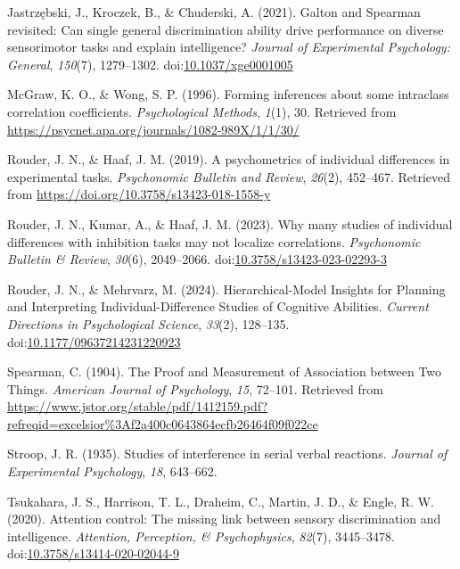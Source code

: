 \documentclass[
  ,man]{apa6}
\newlength{\cslhangindent}
\newenvironment{CSLReferences}[2] %
 {\begin{list}{}{%
  \setlength{\itemindent}{0pt}
  \setlength{\leftmargin}{0pt}
  \setlength{\parsep}{0pt}
  \ifodd #1
   \setlength{\leftmargin}{\cslhangindent}
   \setlength{\itemindent}{-1\cslhangindent}
  \fi
  \setlength{\itemsep}{#2\baselineskip}}}
 {\end{list}}
\begin{document}
\begin{CSLReferences}{1}{0}
Jastrzębski, J., Kroczek, B., \& Chuderski, A. (2021). Galton and {Spearman} revisited: {Can} single general discrimination ability drive performance on diverse sensorimotor tasks and explain intelligence? \emph{Journal of Experimental Psychology: General}, \emph{150}(7), 1279--1302. doi:\href{https://doi.org/10.1037/xge0001005}{10.1037/xge0001005}

McGraw, K. O., \& Wong, S. P. (1996). Forming inferences about some intraclass correlation coefficients. \emph{Psychological Methods}, \emph{1}(1), 30. Retrieved from \url{https://psycnet.apa.org/journals/1082-989X/1/1/30/}

Rouder, J. N., \& Haaf, J. M. (2019). A psychometrics of individual differences in experimental tasks. \emph{Psychonomic Bulletin and Review}, \emph{26}(2), 452--467. Retrieved from \url{https://doi.org/10.3758/s13423-018-1558-y}

Rouder, J. N., Kumar, A., \& Haaf, J. M. (2023). Why many studies of individual differences with inhibition tasks may not localize correlations. \emph{Psychonomic Bulletin \& Review}, \emph{30}(6), 2049--2066. doi:\href{https://doi.org/10.3758/s13423-023-02293-3}{10.3758/s13423-023-02293-3}

Rouder, J. N., \& Mehrvarz, M. (2024). Hierarchical-{Model Insights} for {Planning} and {Interpreting Individual-Difference Studies} of {Cognitive Abilities}. \emph{Current Directions in Psychological Science}, \emph{33}(2), 128--135. doi:\href{https://doi.org/10.1177/09637214231220923}{10.1177/09637214231220923}

Spearman, C. (1904). The {Proof} and {Measurement} of {Association} between {Two Things}. \emph{American Journal of Psychology}, \emph{15}, 72--101. Retrieved from \url{https://www.jstor.org/stable/pdf/1412159.pdf?refreqid=excelsior\%3Af2a400c0643864ecfb26464f09f022ce}

Stroop, J. R. (1935). Studies of interference in serial verbal reactions. \emph{Journal of Experimental Psychology}, \emph{18}, 643--662.

Tsukahara, J. S., Harrison, T. L., Draheim, C., Martin, J. D., \& Engle, R. W. (2020). Attention control: {The} missing link between sensory discrimination and intelligence. \emph{Attention, Perception, \& Psychophysics}, \emph{82}(7), 3445--3478. doi:\href{https://doi.org/10.3758/s13414-020-02044-9}{10.3758/s13414-020-02044-9}

\end{CSLReferences}
\end{document}
